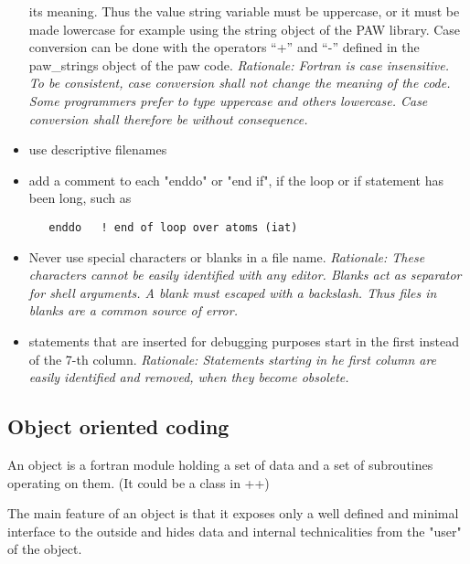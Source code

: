 \documentclass[11pt,a4paper]{report}
\begin{document}
\begin{itemize}
  its meaning. Thus the value string variable must be uppercase, or it
  must be made lowercase for example using the string object of the
  PAW library. Case conversion can be done with the operators ``+''
  and ``-'' defined in the paw\_strings object of the paw
  code. \textit{Rationale: Fortran is case insensitive. To be
    consistent, case conversion shall not change the meaning of the
    code. Some programmers prefer to type uppercase and others
    lowercase. Case conversion shall therefore be without
    consequence.}
%
\item use descriptive filenames
%
\item add a comment to each "enddo" or "end if", if the loop or if
 statement has been long, such as
\begin{verbatim}
   enddo   ! end of loop over atoms (iat)
\end{verbatim}
%
\item Never use special characters or blanks in a file
  name. \textit{Rationale: These characters cannot be easily
    identified with any editor. Blanks act as separator for shell
    arguments. A blank must escaped with a backslash. Thus files in
    blanks are a common source of error.}
%
\item statements that are inserted for debugging purposes start in
  the first instead of the 7-th column. \textit{Rationale: Statements
    starting in he first column are easily identified and removed, when
    they become obsolete.}

\end{itemize}

\subsection{Object oriented coding}
An object is a fortran module holding a set of data and a set of
 subroutines operating on them. (It could be a class in ++)

The main feature of an object is that it exposes only a well defined and
 minimal interface to the outside and hides data and internal
 technicalities from the "user" of the object. 
\end{document}

